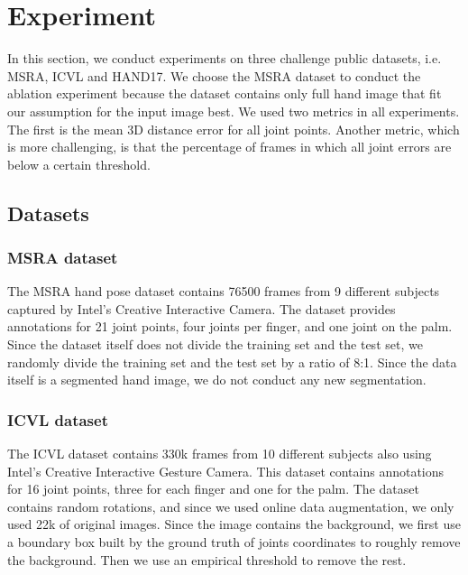 \documentclass[journal]{IEEEtran}
\begin{document}
\section{Experiment}
\label{Experiment}

In this section, we conduct experiments on three challenge public datasets, i.e. MSRA, ICVL and HAND17. 
We choose the MSRA dataset to conduct the ablation experiment because the dataset contains only full hand image 
that fit our assumption for the input image best. 
We used two metrics in all experiments. The first is the mean 3D distance error for all joint points. 
Another metric, which is more challenging, is that the percentage of frames in which all joint errors are below a certain threshold.

\subsection{Datasets}

\subsubsection{MSRA dataset}

The MSRA hand pose dataset\cite{sun2015cascaded} contains 76500 frames from 9 different subjects captured by Intel’s Creative Interactive Camera. 
The dataset provides annotations for 21 joint points, four joints per finger, and one joint on the palm. 
Since the dataset itself does not divide the training set and the test set, 
we randomly divide the training set and the test set by a ratio of 8:1. 
Since the data itself is a segmented hand image, we do not conduct any new segmentation.

\subsubsection{ICVL dataset}

The ICVL dataset\cite{tang2014latent} contains 330k frames from 10 different subjects also using Intel’s Creative Interactive Gesture Camera. 
This dataset contains annotations for 16 joint points, three for each finger and one for the palm. 
The dataset contains random rotations, and since we used online data augmentation, we only used 22k of original images. 
Since the image contains the background, we first use a boundary box built by the ground truth of joints coordinates to 
roughly remove the background. Then we use an empirical threshold to remove the rest.
\end{document}
